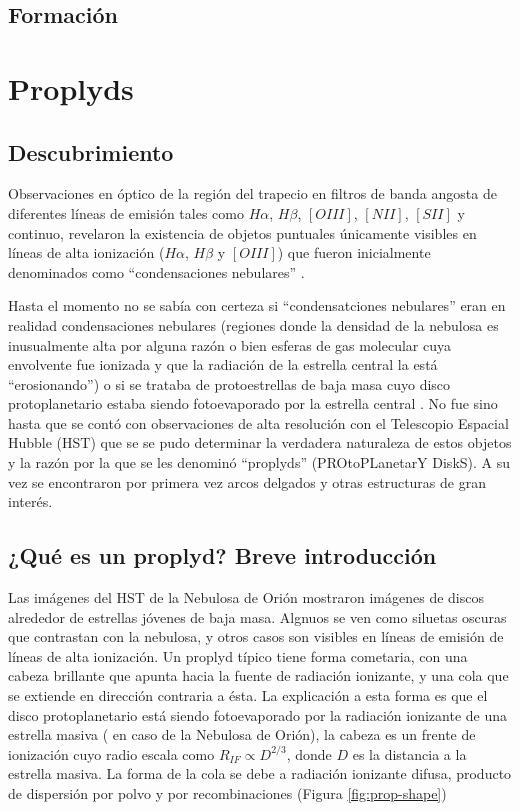 \subsection{Formación}

\section{Proplyds}
\subsection{Descubrimiento}
Observaciones en óptico de la región del trapecio en filtros de banda
angosta de diferentes líneas de emisión tales como $H\alpha$, $H\beta$,
$[OIII]$, $[NII]$, $[SII]$ y continuo, revelaron la existencia de
objetos puntuales únicamente visibles en líneas de alta ionización
($H\alpha$, $H\beta$ y $[OIII]$) que fueron inicialmente denominados como
``condensaciones nebulares'' \citep{Laques:1979}. 

Hasta el momento no se sabía con certeza si ``condensatciones nebulares''
eran en realidad condensaciones nebulares (regiones donde la densidad de
la nebulosa es inusualmente alta por alguna razón o bien esferas de gas
molecular cuya envolvente fue ionizada y que la radiación de la estrella
central la está ``erosionando'') o si se trataba de protoestrellas
de baja masa cuyo disco protoplanetario estaba siendo fotoevaporado por
la estrella central \citep{churchwell:1987}. No fue sino hasta que se contó
con observaciones de alta resolución con el Telescopio Espacial Hubble (HST)
que se se pudo determinar la verdadera naturaleza de estos objetos
\citep{ODell:1993} y la razón por la que se les denominó ``proplyds''
(PROtoPLanetarY DiskS). A su vez se encontraron por primera vez arcos
delgados y otras estructuras de gran interés.

\subsection{¿Qué es un proplyd? Breve introducción \citep{Johnstone:1998}}

Las imágenes del HST de la Nebulosa de Orión mostraron imágenes de discos
alrededor de estrellas jóvenes de baja masa. Algnuos se ven como siluetas
oscuras que contrastan con la nebulosa, y otros casos son visibles en
líneas de emisión de líneas de alta ionización. Un proplyd típico tiene forma
cometaria, con una cabeza brillante que apunta hacia la fuente de radiación
ionizante, y una cola que se extiende en dirección contraria a ésta. La explicación
a esta forma es que el disco protoplanetario está siendo fotoevaporado por la
radiación ionizante de una estrella masiva (\thC{} en caso de la Nebulosa
de Orión), la cabeza es un frente de ionización cuyo radio escala como
$R_{IF} \propto D^{2/3}$, donde $D$ es la distancia a la estrella masiva. La forma
de la cola se debe a radiación ionizante difusa, producto de dispersión por polvo
y por recombinaciones (Figura \ref{fig:prop-shape})

